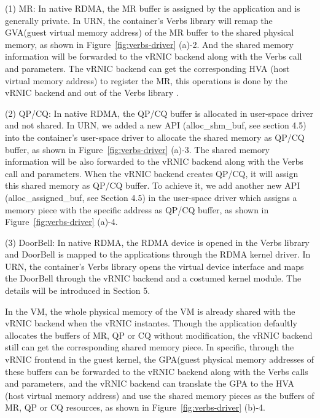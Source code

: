 (1) MR: In native RDMA, the MR buffer is assigned by the application and is generally private. In URN, the container's Verbs library will remap the GVA(guest virtual memory address) of the MR buffer to the shared physical memory, as shown in Figure~\ref{fig:verbs-driver} (a)-2. And the shared memory information will be forwarded to the vRNIC backend along with the Verbs call and parameters. The vRNIC backend can get the corresponding HVA (host virtual memory address) to register the MR, this operations is done by the vRNIC backend and out of the Verbs library .

(2) QP/CQ: In native RDMA, the QP/CQ buffer is allocated in user-space driver and not shared. In URN, we added a new API (alloc\_shm\_buf, see section 4.5) into the container's user-space driver to allocate the shared memory as QP/CQ buffer, as shown in Figure~\ref{fig:verbs-driver} (a)-3. The shared memory information will be also forwarded to the vRNIC backend along with the Verbs call and parameters. When the vRNIC backend creates QP/CQ, it will assign this shared memory as QP/CQ buffer. To achieve it, we add another new API (alloc\_assigned\_buf, see Section 4.5) in the user-space driver which assigns a memory piece with the specific address as QP/CQ buffer, as shown in Figure~\ref{fig:verbs-driver} (a)-4.

(3) DoorBell: In native RDMA, the RDMA device is opened in the Verbs library and DoorBell is mapped to the applications through the RDMA kernel driver. In URN, the container's Verbs library opens the virtual device interface and maps the DoorBell through the vRNIC backend and a costumed kernel module. The details will be introduced in Section 5.

In the VM, the whole physical memory of the VM is already shared with the vRNIC backend when the vRNIC instantes. Though the application defaultly allocates the buffers of MR, QP or CQ without modification, the vRNIC backend still can get the corresponding shared memory piece. In specific, through the vRNIC frontend in the guest kernel, the GPA(guest physical memory addresses of these buffers can be forwarded to the vRNIC backend along with the Verbs calls and parameters, and the vRNIC backend can translate the GPA to the HVA (host virtual memory address) and use the shared memory pieces as the buffers of MR, QP or CQ resources, as shown in Figure~\ref{fig:verbs-driver} (b)-4.

